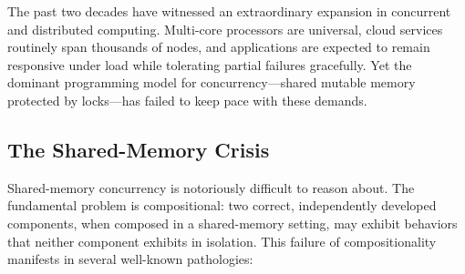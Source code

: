 \documentclass[11pt,a4paper]{article}
\begin{document}
The past two decades have witnessed an extraordinary expansion in concurrent and distributed computing. Multi-core processors are universal, cloud services routinely span thousands of nodes, and applications are expected to remain responsive under load while tolerating partial failures gracefully. Yet the dominant programming model for concurrency---shared mutable memory protected by locks---has failed to keep pace with these demands.

\subsection{The Shared-Memory Crisis}

Shared-memory concurrency is notoriously difficult to reason about. The fundamental problem is compositional: two correct, independently developed components, when composed in a shared-memory setting, may exhibit behaviors that neither component exhibits in isolation. This failure of compositionality manifests in several well-known pathologies:
\end{document}

